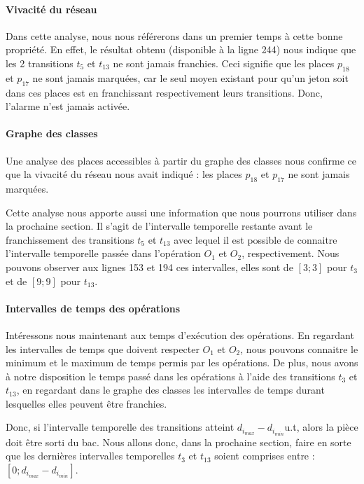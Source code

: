 \paragraph*{Vivacité du réseau} Dans cette analyse, nous nous référerons dans un premier temps à cette bonne propriété. En effet, le résultat obtenu (disponible à la ligne 244) nous indique que les 2 transitions $t_5$ et $t_{13}$ ne sont jamais franchies. Ceci signifie que les places $p_{18}$ et $p_{17}$ ne sont jamais marquées, car le seul moyen existant pour qu'un jeton soit dans ces places est en franchissant respectivement leurs transitions. Donc, l'alarme n'est jamais activée.

\paragraph*{Graphe des classes} Une analyse des places accessibles à partir du graphe des classes nous confirme ce que la vivacité du réseau nous avait indiqué : les places $p_{18}$ et $p_{17}$ ne sont jamais marquées. 

Cette analyse nous apporte aussi une information que nous pourrons utiliser dans la prochaine section. Il s'agit de l'intervalle temporelle restante avant le franchissement des transitions $t_5$ et $t_{13}$ avec lequel il est possible de connaitre l'intervalle temporelle passée dans l'opération $O_1$ et $O_2$, respectivement. Nous pouvons observer aux lignes 153 et 194 ces intervalles, elles sont de $[3;3]$ pour $t_3$ et de $[9;9]$ pour $t_{13}$. 

\paragraph*{Intervalles de temps des opérations} Intéressons nous maintenant aux temps d'exécution des opérations. En regardant les intervalles de temps que doivent respecter $O_1$ et $O_2$, nous pouvons connaitre le minimum et le maximum de temps permis par les opérations. De plus, nous avons à notre disposition le temps passé dans les opérations à l'aide des transitions $t_3$ et $t_{13}$, en regardant dans le graphe des classes les intervalles de temps durant lesquelles elles peuvent être franchies. 

Donc, si l'intervalle temporelle des transitions atteint $d_{i_{max}} - d_{i_{min}}$u.t, alors la pièce doit être sorti du bac. Nous allons donc, dans la prochaine section, faire en sorte que les dernières intervalles temporelles  $t_3$ et $t_{13}$ soient comprises entre : $[0;d_{i_{max}} - d_{i_{min}}]$.

